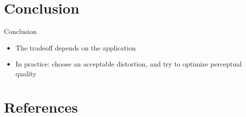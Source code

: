 \documentclass[xcolor=pdftex,dvipsnames,table,mathserif]{beamer}
\begin{document}
\section{Conclusion}

\begin{frame}{Conclusion}

  \begin{itemize}[<+->]
  \item The tradeoff depends on the application
  \item In practice: choose an acceptable distortion, and try to optimize perceptual quality
\end{itemize}


\end{frame}




\section*{References}


\end{document}
